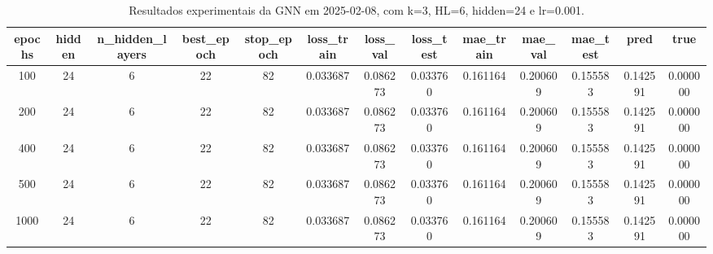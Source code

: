 \begin{table}[h]
\centering
\caption{Resultados experimentais da GNN em 2025-02-08, com k=3, HL=6, hidden=24 e lr=0.001.}
\label{tab:gnn_results_k3_hl6_h24_d20250208}
\begin{tabular}{ccccccccccccc}
\toprule
epochs & hidden & n\_hidden\_layers & best\_epoch & stop\_epoch & loss\_train & loss\_val & loss\_test & mae\_train & mae\_val & mae\_test & pred & true \\
\midrule
100 & 24 & 6 & 22 & 82 & 0.033687 & 0.086273 & 0.033760 & 0.161164 & 0.200609 & 0.155583 & 0.142591 & 0.000000 \\
200 & 24 & 6 & 22 & 82 & 0.033687 & 0.086273 & 0.033760 & 0.161164 & 0.200609 & 0.155583 & 0.142591 & 0.000000 \\
400 & 24 & 6 & 22 & 82 & 0.033687 & 0.086273 & 0.033760 & 0.161164 & 0.200609 & 0.155583 & 0.142591 & 0.000000 \\
500 & 24 & 6 & 22 & 82 & 0.033687 & 0.086273 & 0.033760 & 0.161164 & 0.200609 & 0.155583 & 0.142591 & 0.000000 \\
1000 & 24 & 6 & 22 & 82 & 0.033687 & 0.086273 & 0.033760 & 0.161164 & 0.200609 & 0.155583 & 0.142591 & 0.000000 \\
\bottomrule
\end{tabular}
\end{table}
